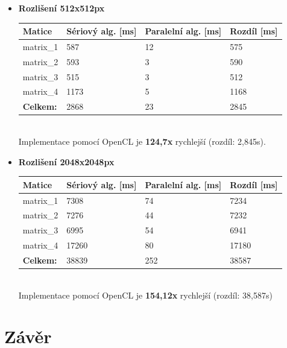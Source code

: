 \documentclass[10pt,a4paper]{article}
\begin{document}
\begin{itemize}
	\item \textbf{Rozlišení 512x512px }\\[0.5cm]
	\begin{tabular}{|p{3cm}||p{3cm}|p{3.5cm}|p{2cm}|}	
		\hline
		\textbf{Matice} & \textbf{Sériový alg. [ms]} & \textbf{Paralelní alg. [ms]} & \textbf{Rozdíl [ms]}	\\
		\hline
		\hline
		matrix\_1 &					587	&						12	&							575	\\
		\hline
		matrix\_2 &					593	&						3	&							590	\\
		\hline
		matrix\_3 &					515	&						3	&							512	\\
		\hline
		matrix\_4 &					1173&						5	&							1168\\
		\hline
		\hline
		\textbf{Celkem:}	&		2868&						23	&							2845\\
		\hline
	\end{tabular}\\[0.3cm]

	Implementace pomocí OpenCL je \textbf{124,7x} rychlejší (rozdíl: 2,845s).
	
	\item \textbf{Rozlišení 2048x2048px}\\[0.5cm]
	\begin{tabular}{|p{3cm}||p{3cm}|p{3.5cm}|p{2cm}|}	
		\hline
		\textbf{Matice} & \textbf{Sériový alg. [ms]} & \textbf{Paralelní alg. [ms]} & \textbf{Rozdíl [ms]}	\\
		\hline
		\hline
		matrix\_1 &					7308	&						74	&							7234	\\
		\hline
		matrix\_2 &					7276	&						44	&							7232	\\
		\hline
		matrix\_3 &					6995	&						54	&							6941	\\
		\hline
		matrix\_4 &					17260	&						80	&							17180	\\
		\hline
		\hline
		\textbf{Celkem:}	&		38839	&						252	&							38587	\\
		\hline
	\end{tabular}\\[0.3cm]
	
	Implementace pomocí OpenCL je \textbf{154,12x} rychlejší (rozdíl: 38,587s)
	
\end{itemize}

\section{Závěr}
\end{document}
